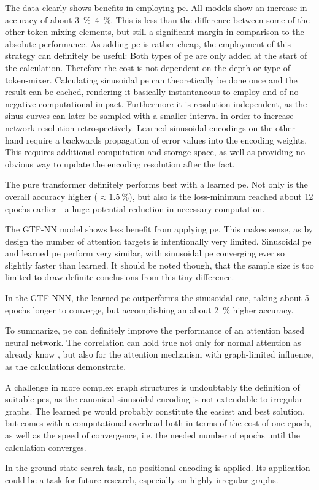 The data clearly shows benefits in employing pe. 
All models show an increase in accuracy of about \SIrange[]{3}{4}{\percent}. 
This is less than the difference between some of the other token mixing elements, but still a significant margin in comparison to the absolute performance.
As adding pe is rather cheap, the employment of this strategy can definitely be useful:
Both types of pe are only added at the start of the calculation.
Therefore the cost is not dependent on the depth or type of token-mixer.
Calculating sinusoidal pe can theoretically be done once and the result can be cached, rendering it basically instantaneous to employ and of no negative computational impact. Furthermore it is resolution independent, as the sinus curves can later be sampled with a smaller interval in order to increase network resolution retrospectively.
Learned sinusoidal encodings on the other hand require a backwards propagation of error values into the encoding weights.
This requires additional computation and storage space, as well as providing no obvious way to update the encoding resolution after the fact.

The pure transformer definitely performs best with a learned pe. 
Not only is the overall accuracy higher ($\approx \SI[]{1.5}[]{\percent}$), but also is the loss-minimum reached about 12 epochs earlier - a huge potential reduction in necessary computation.

The GTF-NN model shows less benefit from applying pe.
This makes sense, as by design the number of attention targets is intentionally very limited. 
Sinusoidal pe and learned pe perform very similar, with sinusoidal pe converging ever so slightly faster than learned.
It should be noted though, that the sample size is too limited to draw definite conclusions from this tiny difference.

In the GTF-NNN, the learned pe outperforms the sinusoidal one, taking about 5 epochs longer to converge, but accomplishing an about \SI[]{2}{\percent} higher accuracy.

To summarize, pe can definitely improve the performance of an attention based neural network. 
The correlation can hold true not only for normal attention as already know \cite{attentionIsAllYouNeed, imageWorth16x16}, but also for the attention mechanism with graph-limited influence, as the calculations demonstrate.

A challenge in more complex graph structures is undoubtably the definition of suitable pes, as the canonical sinusoidal encoding is not  extendable to irregular graphs.
The learned pe would probably constitute the easiest and best solution, but comes with a computational overhead both in terms of the cost of one epoch, as well as the speed of convergence, i.e. the needed number of epochs until the calculation converges.

In the ground state search task, no positional encoding is applied. 
Its application could be a task for future research, especially on highly irregular graphs.